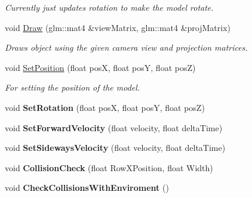 \begin{DoxyCompactItemize}
\begin{DoxyCompactList}\small\item\em Currently just updates rotation to make the model rotate. \end{DoxyCompactList}\item 
\hypertarget{class_game_model_a8932ce02575d6d95998525a3ffa9dc6f}{void \hyperlink{class_game_model_a8932ce02575d6d95998525a3ffa9dc6f}{Draw} (glm\+::mat4 \&view\+Matrix, glm\+::mat4 \&proj\+Matrix)}\label{class_game_model_a8932ce02575d6d95998525a3ffa9dc6f}

\begin{DoxyCompactList}\small\item\em Draws object using the given camera view and projection matrices. \end{DoxyCompactList}\item 
\hypertarget{class_game_model_adfa6b9496ae9d78ff322d4ba750aca47}{void \hyperlink{class_game_model_adfa6b9496ae9d78ff322d4ba750aca47}{Set\+Position} (float pos\+X, float pos\+Y, float pos\+Z)}\label{class_game_model_adfa6b9496ae9d78ff322d4ba750aca47}

\begin{DoxyCompactList}\small\item\em For setting the position of the model. \end{DoxyCompactList}\item 
\hypertarget{class_game_model_ad8c77740e4a18ef6fb584191fb301ec9}{void {\bfseries Set\+Rotation} (float pos\+X, float pos\+Y, float pos\+Z)}\label{class_game_model_ad8c77740e4a18ef6fb584191fb301ec9}

\item 
\hypertarget{class_game_model_ad0e31cce34ab2fab851e27ce854477da}{void {\bfseries Set\+Forward\+Velocity} (float velocity, float delta\+Time)}\label{class_game_model_ad0e31cce34ab2fab851e27ce854477da}

\item 
\hypertarget{class_game_model_a38656b1ab42c7da926a3c7c3be2d2325}{void {\bfseries Set\+Sideways\+Velocity} (float velocity, float delta\+Time)}\label{class_game_model_a38656b1ab42c7da926a3c7c3be2d2325}

\item 
\hypertarget{class_game_model_a086d667db88721ea349beb1faec779fa}{void {\bfseries Collision\+Check} (float Row\+X\+Position, float Width)}\label{class_game_model_a086d667db88721ea349beb1faec779fa}

\item 
\hypertarget{class_game_model_ae41ab3bff6bad9c5ca3bf54c3551c870}{void {\bfseries Check\+Collisions\+With\+Enviroment} ()}\label{class_game_model_ae41ab3bff6bad9c5ca3bf54c3551c870}


\end{DoxyCompactItemize}
